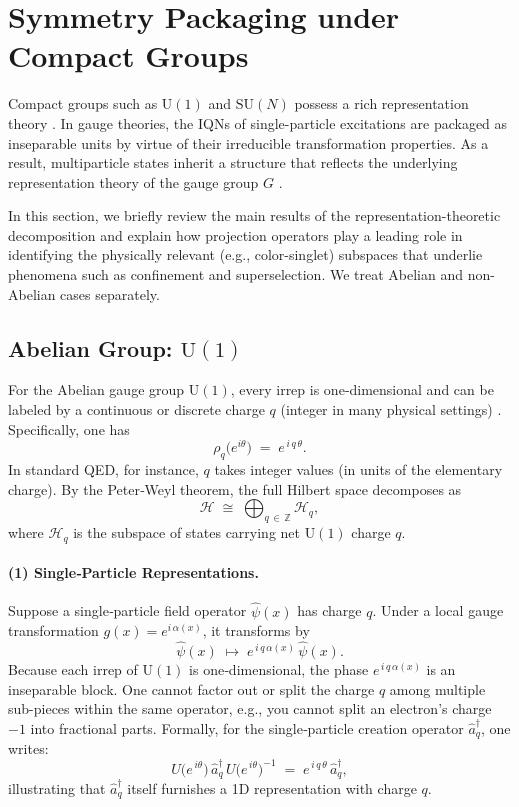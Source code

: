 \documentclass[12pt,a4paper]{article}
\begin{document}
\section{Symmetry Packaging under Compact Groups}
\label{SEC:SymmetryPackagingOnCompactLieGroups}


Compact groups such as $\mathrm{U}(1)$ and $\mathrm{SU}(N)$ possess a rich representation theory \cite{Yang1954,Gross1973,Weyl1929,GellMann1961}.
In gauge theories, the IQNs of single-particle excitations are packaged as inseparable units by virtue of their irreducible transformation properties.
As a result, multiparticle states inherit a structure that reflects the underlying representation theory of the gauge group $G$ \cite{Utiyama1956,Cartan1913}.


In this section, we briefly review the main results of the representation-theoretic decomposition and explain how projection operators play a leading role in identifying the physically relevant (e.g., color-singlet) subspaces that underlie phenomena such as confinement and superselection.
We treat Abelian and non-Abelian cases separately.



\subsection{Abelian Group: $\mathrm{U}(1)$}

For the Abelian gauge group $\mathrm{U}(1)$, every irrep is one‐dimensional and can be labeled by a continuous or discrete charge $q$ (integer in many physical settings) \cite{Weyl1929}.
Specifically, one has
\[
\rho_q\bigl(e^{i\theta}\bigr) \;=\; e^{\,i\,q\,\theta}.
\]
In standard QED, for instance, $q$ takes integer values (in units of the elementary charge).
By the Peter‐Weyl theorem, the full Hilbert space decomposes as
\begin{equation}\label{EQ:U(1)Decomposition}
	\mathcal{H}
	\;\cong\;
	\bigoplus_{q \,\in\, \mathbb{Z}} \mathcal{H}_q,
\end{equation}
where $\mathcal{H}_q$ is the subspace of states carrying net $\mathrm{U}(1)$ charge $q$.


\paragraph{(1) Single‐Particle Representations.}
Suppose a single‐particle field operator $\hat{\psi}(x)$ has charge $q$. Under a local gauge transformation $g(x) = e^{i\,\alpha(x)}$, it transforms by
\[
\hat{\psi}(x) \;\mapsto\;
e^{\,i\,q\,\alpha(x)}\,\hat{\psi}(x).
\]
Because each irrep of $\mathrm{U}(1)$ is one‐dimensional, the phase $e^{\,i\,q\,\alpha(x)}$ is an inseparable block.
One cannot factor out or split the charge $q$ among multiple sub-pieces within the same operator, e.g., you cannot split an electron’s charge $-1$ into fractional parts.
Formally, for the single‐particle creation operator $\hat{a}^\dagger_{q}$, one writes:
\[
U\bigl(e^{\,i\theta}\bigr)\,\hat{a}^\dagger_{q}\,U\bigl(e^{\,i\theta}\bigr)^{-1}
\;=\;
e^{\,i\,q\,\theta}\,\hat{a}^\dagger_{q},
\]
illustrating that $\hat{a}^\dagger_{q}$ itself furnishes a 1D representation with charge $q$.
\end{document}
